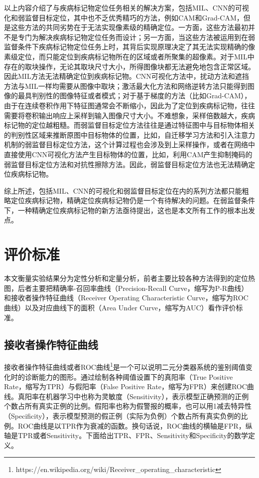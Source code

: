以上内容介绍了与疾病标记物定位任务相关的解决方案，包括MIL、CNN的可视化和弱监督目标定位，其中也不乏优秀精巧的方法，例如CAM和Grad-CAM，但是这些方法的共同劣势在于无法实现像素级的精确定位。一方面，这些方法最初并不是专门为解决疾病标记物定位任务而设计；另一方面，当这些方法被运用到在弱监督条件下疾病标记物定位任务上时，其背后实现原理决定了其无法实现精确的像素级定位，而只能定位到疾病标记物所在的区域或者所聚集的超像素。对于MIL中存在的取块操作，无论其取块尺寸大小，所得图像块都无法避免地包含正常区域。因此MIL方法无法精确定位到疾病标记物。CNN可视化方法中，扰动方法和遮挡方法与MIL一样均需要从图像中取块；激活最大化方法和网络逆转方法只能得到图像的最具判别性的图像特征或者模式；对于基于梯度的方法（比如Grad-CAM），由于在连续卷积作用下特征图通常会不断缩小，因此为了定位到疾病标记物，往往需要将卷积输出响应上采样到输入图像尺寸大小。不难想象，采样倍数越大，疾病标记物的定位越粗糙。而弱监督目标定位方法往往是通过特征图中与目标物体相关的判别性区域来推断原图中目标物体的位置，比如，自迁移学习方法和引入注意力机制的弱监督目标定位方法，这个计算过程也会涉及到上采样操作，或者在网络中直接使用CNN可视化方法产生目标物体的位置，比如，利用CAM产生抑制掩码的弱监督目标定位方法和对抗性擦除方法。因此，弱监督目标定位方法也无法精确定位疾病标记物。

综上所述，包括MIL、CNN的可视化和弱监督目标定位在内的系列方法都只能粗略定位疾病标记物，精确定位疾病标记物仍是一个有待解决的问题。在弱监督条件下，一种精确定位疾病标记物的新方法亟待提出，这也是本文所有工作的根本出发点。
\section{评价标准}\label{sec:evaluation_metrics}
本文衡量实验结果分为定性分析和定量分析，前者主要比较各种方法得到的定位热图，后者主要把精确率-召回率曲线（Precision-Recall Curve，缩写为P-R曲线）和接收者操作特征曲线（Receiver Operating Characteristic Curve，缩写为ROC曲线）以及对应曲线下的面积（Area Under Curve，缩写为AUC）看作评价标准。
\subsection{接收者操作特征曲线}\label{subsec:roc_curve}
接收者操作特征曲线或者ROC曲线\footnote{https://en.wikipedia.org/wiki/Receiver\_operating\_characteristic}是一个可以说明二元分类器系统的鉴别阈值变化时的诊断能力的图形。通过绘制各种阈值设置下的真阳率（True Positive Rate，缩写为TPR）与假阳率（False Positive Rate，缩写为FPR）来创建ROC曲线。真阳率在机器学习中也称为灵敏度（Sensitivity），表示模型正确预测的正例个数占所有真实正例的比例。假阳率也称为假警报的概率，也可以用1减去特异性（Specificity），表示模型预测的假正例（实际为负例）个数占所有真实负例的比例。ROC曲线是以TPR作为衰减的函数。换句话说，ROC曲线的横轴是FPR，纵轴是TPR或者Sensitivity。下面给出TPR、FPR、Sensitivity和Specificity的数学定义。

